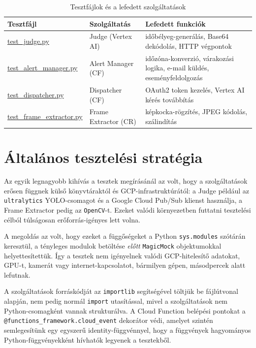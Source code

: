 \documentclass[12pt,a4paper]{article}
\newcommand{\tname}[1]{\url{#1}}
\begin{document}
\begin{table}[H]
\centering
\caption{Tesztfájlok és a lefedett szolgáltatások}
\renewcommand{\arraystretch}{1.2}
\small
\begin{tabular}{|p{4.8cm}|p{3cm}|p{6cm}|}
    \hline
    \textbf{Tesztfájl} & \textbf{Szolgáltatás} & \textbf{Lefedett funkciók} \\
    \hline
    \tname{test\_judge.py} & Judge (Vertex AI) & időbélyeg-generálás, Base64 dekódolás, HTTP végpontok \\
    \hline
    \tname{test\_alert\_manager.py} & Alert Manager (CF) & időzóna-konverzió, várakozási logika, e-mail küldés, eseményfeldolgozás \\
    \hline
    \tname{test\_dispatcher.py} & Dispatcher (CF) & OAuth2 token kezelés, Vertex AI kérés továbbítás \\
    \hline
    \tname{test\_frame\_extractor.py} & Frame Extractor (CR) & képkocka-rögzítés, JPEG kódolás, szálindítás \\
    \hline
\end{tabular}
\end{table}

\section{Általános tesztelési stratégia}

Az egyik legnagyobb kihívás a tesztek megírásánál az volt, hogy a szolgáltatások
erősen függnek külső könyvtáraktól és GCP-infrastruktúrától: a Judge például az
\texttt{ultralytics} YOLO-csomagot és a Google Cloud Pub/Sub klienst használja,
a Frame Extractor pedig az \texttt{OpenCV}-t. Ezeket valódi környezetben futtatni
tesztelési célból túlságosan erőforrás-igényes lett volna.

A megoldás az volt, hogy ezeket a függőségeket a Python \texttt{sys.modules}
szótárán keresztül, a tényleges modulok betöltése \emph{előtt} \texttt{MagicMock}
objektumokkal helyettesítettük. Így a tesztek nem igényelnek valódi GCP-hitelesítő
adatokat, GPU-t, kamerát vagy internet-kapcsolatot, bármilyen gépen, másodpercek
alatt lefutnak.

A szolgáltatások forráskódját az \texttt{importlib} segítségével töltjük be
fájlútvonal alapján, nem pedig normál \texttt{import} utasítással, mivel a
szolgáltatások nem Python-csomagként vannak strukturálva. A Cloud Function
belépési pontokat a \texttt{@functions\_framework.cloud\_event} dekorátor védi,
amelyet szintén semlegesítünk egy egyszerű identity-függvénnyel, hogy a függvények
hagyományos Python-függvényekként hívhatók legyenek a tesztekből.
\end{document}
